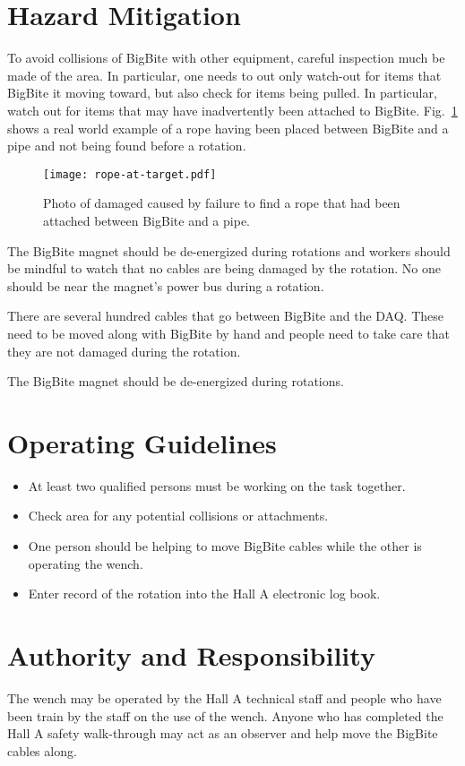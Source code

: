 \section{Hazard Mitigation}


To avoid collisions of BigBite with other equipment, careful inspection much be made of the area.
In particular, one needs to out only watch-out for items that BigBite it moving toward, but also check
for items being pulled.  In particular, watch out for items that may have inadvertently been attached to BigBite.
Fig.~\ref{rope-hazard} shows a real world example of a rope having been placed between BigBite and a pipe
and not being found before a rotation.

\begin{figure}[htb]
\texttt{[image: rope-at-target.pdf]}
\caption{Photo of damaged caused by failure to find a rope that had been attached between BigBite
and a pipe.}
\label{rope-hazard}
\end{figure}

The BigBite magnet should be de-energized during rotations and workers should be mindful to watch that
no cables are being damaged by the rotation.  No one should be near the magnet's power bus during
a rotation.

There are several hundred cables that go between BigBite and the DAQ.  These need to be moved along with
BigBite by hand and people need to take care that they are not damaged during the rotation.

The BigBite magnet should be de-energized during rotations.

\section{Operating Guidelines}

\begin{itemize}
\item{At least two qualified persons must be working on the task together.}
\item{Check area for any potential collisions or attachments.}
\item{One person should be helping to move BigBite cables while the other is operating
the wench.}
\item{Enter record of the rotation into the Hall A electronic log book.}
\end{itemize}

\section{Authority and Responsibility}

The wench may be operated by the Hall A technical staff and people who have been train by the
staff on the use of the wench.  Anyone who has completed the Hall A safety walk-through may act 
as an observer and help move the BigBite cables along.


